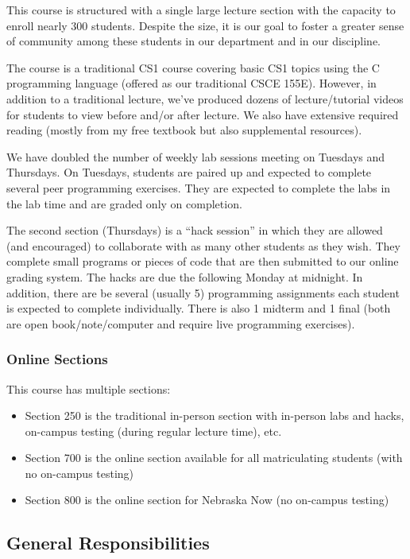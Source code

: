 \documentclass[12pt]{scrartcl}
\begin{document}
This course is structured with a single large lecture section with the
capacity to enroll nearly 300 students.  Despite the size, it is our 
goal to foster a greater sense of community among these students in 
our department and in our discipline.  

The course is a traditional CS1 course covering basic CS1 topics 
using the C programming language (offered as our traditional CSCE 155E).  
However, in addition to a traditional lecture, we've produced dozens of 
lecture/tutorial videos for students to view before and/or after lecture.  
We also have extensive required reading (mostly from my free textbook but 
also supplemental resources).  

We have doubled the number of weekly lab sessions meeting on Tuesdays and
Thursdays.  On Tuesdays, students are paired up and expected to complete 
several peer programming exercises.  They are 
expected to complete the labs in the lab time and are graded only on 
completion.

The second section (Thursdays) is a ``hack session'' in which they are 
allowed (and encouraged) to collaborate with as many other students as 
they wish.  They complete small programs or pieces of code that are 
then submitted to our online grading system.  The hacks are due the 
following Monday at midnight.  In addition, there are
be several (usually 5) programming assignments each student is expected
to complete individually.  There is also 1 midterm and 1 final (both 
are open book/note/computer and require live programming exercises). 

\subsubsection*{Online Sections}

This course has multiple sections:
\begin{itemize}
  \item Section 250 is the traditional in-person section with in-person
  labs and hacks, on-campus testing (during regular lecture time), etc.
  \item Section 700 is the online section available for all matriculating
  students (with no on-campus testing)
  \item Section 800 is the online section for Nebraska Now (no on-campus
  testing)
\end{itemize}

\subsection*{General Responsibilities}
\end{document}
